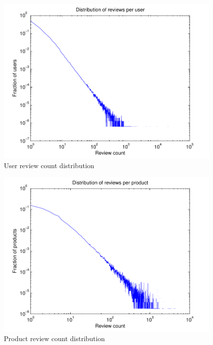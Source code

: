 \documentclass[letterpaper, 11 pt, conference]{ieeeconf}
\begin{document}
\begin{figure}[h]
\includegraphics[scale=0.6]{images/user_hist.pdf}
\caption{User review count distribution}
\label{fig:userhist}
\end{figure}

\begin{figure}[h]
\includegraphics[scale=0.6]{images/product_hist.pdf}
\caption{Product review count distribution}
\label{fig:producthist}
\end{figure}
\end{document}
